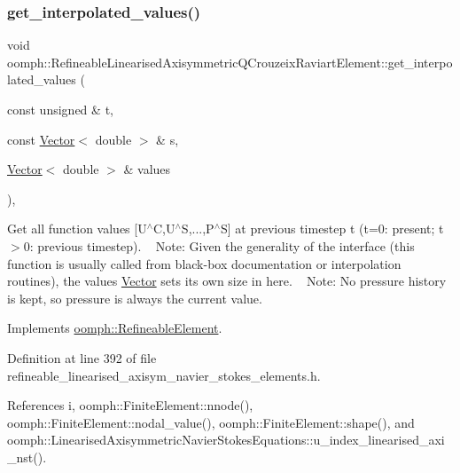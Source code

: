 \subsubsection{\texorpdfstring{get\+\_\+interpolated\+\_\+values()}{get\_interpolated\_values()}\hspace{0.1cm}{\footnotesize\ttfamily [2/2]}}
{\footnotesize\ttfamily void oomph\+::\+Refineable\+Linearised\+Axisymmetric\+Q\+Crouzeix\+Raviart\+Element\+::get\+\_\+interpolated\+\_\+values (\begin{DoxyParamCaption}\item[{const unsigned \&}]{t,  }\item[{const \hyperlink{classoomph_1_1Vector}{Vector}$<$ double $>$ \&}]{s,  }\item[{\hyperlink{classoomph_1_1Vector}{Vector}$<$ double $>$ \&}]{values }\end{DoxyParamCaption})\hspace{0.3cm}{\ttfamily [inline]}, {\ttfamily [virtual]}}



Get all function values \mbox{[}U$^\wedge$C,U$^\wedge$S,...,P$^\wedge$S\mbox{]} at previous timestep t (t=0\+: present; t$>$0\+: previous timestep). ~\newline
 Note\+: Given the generality of the interface (this function is usually called from black-\/box documentation or interpolation routines), the values \hyperlink{classoomph_1_1Vector}{Vector} sets its own size in here. ~\newline
Note\+: No pressure history is kept, so pressure is always the current value. 



Implements \hyperlink{classoomph_1_1RefineableElement_ada6f0efe831ffefb1d2829ce01d45bfc}{oomph\+::\+Refineable\+Element}.



Definition at line 392 of file refineable\+\_\+linearised\+\_\+axisym\+\_\+navier\+\_\+stokes\+\_\+elements.\+h.



References i, oomph\+::\+Finite\+Element\+::nnode(), oomph\+::\+Finite\+Element\+::nodal\+\_\+value(), oomph\+::\+Finite\+Element\+::shape(), and oomph\+::\+Linearised\+Axisymmetric\+Navier\+Stokes\+Equations\+::u\+\_\+index\+\_\+linearised\+\_\+axi\+\_\+nst().

\mbox{\label{classoomph_1_1RefineableLinearisedAxisymmetricQCrouzeixRaviartElement_afb9f9d03f8e2e0fb326d0d1fef0a5806}} 
